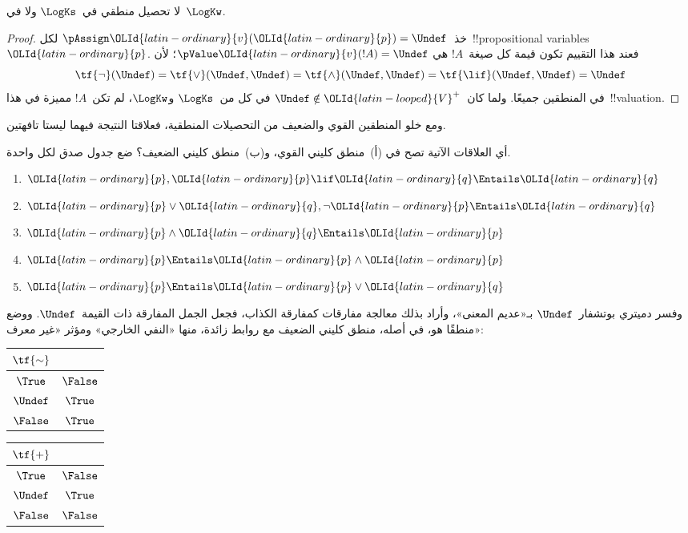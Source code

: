 \documentclass[../../../include/open-logic-section]{subfiles}
\begin{document}
\begin{prop}
  لا تحصيل منطقي في~$\LogKs$ ولا في~$\LogKw$.
\end{prop}

\begin{proof}
  خذ~$\pAssign \OLId{latin-ordinary}{v}(\OLId{latin-ordinary}{p}) = \Undef$ لكل~!!{propositional variable}s~$\OLId{latin-ordinary}{p}$.
  فعند هذا التقييم تكون قيمة كل صيغة~$!A$ هي
  $\pValue \OLId{latin-ordinary}{v}(!A) = \Undef$؛ لأن
  \[
    \tf{\lnot}(\Undef) = \tf{\lor}(\Undef, \Undef) = \tf{\land}(\Undef,
  \Undef) = \tf{\lif}(\Undef, \Undef) = \Undef
  \]
  في المنطقين جميعًا. ولما كان~$\Undef \notin \OLId{latin-looped}{V}^+$ في كل من~$\LogKs$
  و$\LogKw$، لم تكن~$!A$ مميزة في هذا~!!{valuation}.
\end{proof}

ومع خلو المنطقين القوي والضعيف من التحصيلات المنطقية، فعلاقتا
النتيجة فيهما ليستا تافهتين.

\begin{prob}
  أي العلاقات الآتية تصح في (أ)~منطق كليني القوي، و(ب)~منطق كليني
  الضعيف؟ ضع جدول صدق لكل واحدة.
  \begin{enumerate}
    \item $\OLId{latin-ordinary}{p}, \OLId{latin-ordinary}{p} \lif \OLId{latin-ordinary}{q} \Entails \OLId{latin-ordinary}{q}$
    \item $\OLId{latin-ordinary}{p} \lor \OLId{latin-ordinary}{q}, \lnot \OLId{latin-ordinary}{p} \Entails \OLId{latin-ordinary}{q}$
    \item $\OLId{latin-ordinary}{p} \land \OLId{latin-ordinary}{q} \Entails \OLId{latin-ordinary}{p}$
    \item $\OLId{latin-ordinary}{p} \Entails \OLId{latin-ordinary}{p} \land \OLId{latin-ordinary}{p}$
    \item $\OLId{latin-ordinary}{p} \Entails \OLId{latin-ordinary}{p} \lor \OLId{latin-ordinary}{q}$
  \end{enumerate}
\end{prob}

وفسر دميتري بوتشفار~$\Undef$ بـ«عديم المعنى»، وأراد بذلك معالجة
مفارقات كمفارقة الكذاب، فجعل الجمل المفارقة ذات القيمة~$\Undef$.
ووضع منطقًا هو، في أصله، منطق كليني الضعيف مع روابط زائدة، منها
«النفي الخارجي» ومؤثر «غير معرف»:
\begin{center}
  \begin{tabular}{c|c}
    $\tf{\sim}$ & \\
    \hline
    $\True$ & $\False$ \\
    $\Undef$ & $\True$ \\
    $\False$ & $\True$
  \end{tabular}
\quad
  \begin{tabular}{c|c}
    $\tf{+}$ & \\
    \hline
    $\True$ & $\False$ \\
    $\Undef$ & $\True$ \\
    $\False$ & $\False$
  \end{tabular}
\end{center}
\end{document}
